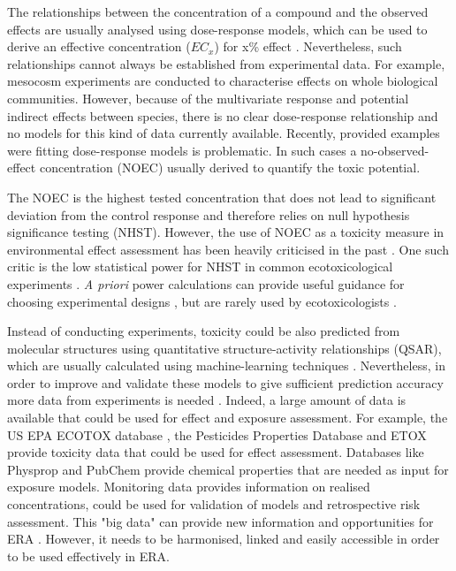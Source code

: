 The relationships between the concentration of a compound and the observed effects are usually analysed using dose-response models, which can be used to derive an effective concentration ($EC_{x}$) for x\% effect  \citep{ritz_toward_2010}. 
Nevertheless, such relationships cannot always be established from experimental data.
For example, mesocosm experiments are conducted to characterise effects on whole biological communities.
However, because of the multivariate response and potential indirect effects between species, there is no clear dose-response relationship and no models for this kind of data currently available. 
Recently, \citet{green_issues_2016} provided examples were fitting dose-response models is problematic. 
In such cases a no-observed-effect concentration (NOEC) usually derived to quantify the toxic potential.

The NOEC is the highest tested concentration that does not lead to significant deviation from the control response and therefore relies on null hypothesis significance testing (NHST). 
However, the use of NOEC as a toxicity measure in environmental effect assessment has been heavily criticised in the past \citep{laskowski_good_1995, chapman_warning:_1996, warne_noec_2008, fox_what_2012, jager_bad_2012, fox_dont_2016}. 
One such critic is the low statistical power for NHST in common ecotoxicological experiments \citep{van_der_hoeven_power_1998}.
\emph{A priori} power calculations can provide useful guidance for choosing experimental designs \citep{johnson_power_2015}, but are rarely used by ecotoxicologists \citep{newman_what_2008}. 

Instead of conducting experiments, toxicity could be also predicted from molecular structures using quantitative structure-activity relationships (QSAR), which are usually calculated using machine-learning techniques \citep{breiman_statistical_2001-1, murrell_chemically_2015, cortes-ciriano_bioalerts:_2016}. 
Nevertheless, in order to improve and validate these models to give sufficient prediction accuracy more data from experiments is needed \citep{kuhne_read-across_2013}. 
Indeed, a large amount of data is available that could be used for effect and exposure assessment. 
For example, the US EPA ECOTOX database \citep{u.s._epa_ecotoxicology_2016}, the Pesticides Properties Database \citep{lewis_international_2016} and ETOX \citep{umweltbundesamt_etox:_2016} provide toxicity data that could be used for effect assessment.
Databases like Physprop \citep{howard_physical_2016} and PubChem \citep{kim_pubchem_2016} provide chemical properties that are needed as input for exposure models.
Monitoring data provides information on realised concentrations, could be used for validation of models and retrospective risk assessment.
This "big data" can provide new information and opportunities for ERA \citep{dafforn_big_2015}. 
However, it needs to be harmonised, linked and easily accessible in order to be used effectively in ERA.



